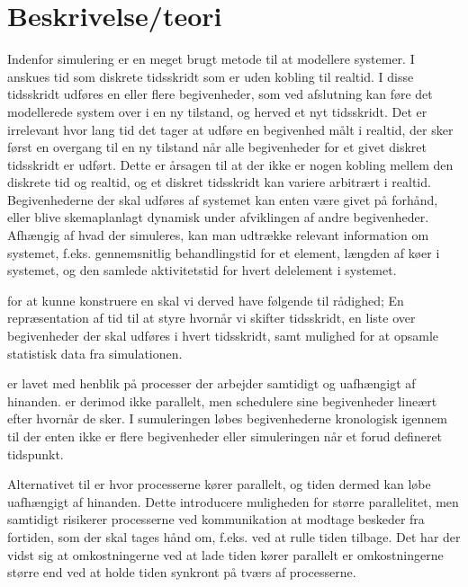 \section{Beskrivelse/teori} \label{sec:des-teori}


Indenfor simulering er \des en meget brugt metode til at modellere systemer. I 
\des anskues tid som diskrete tidsskridt som er uden kobling til realtid. I 
disse tidsskridt udføres en eller flere begivenheder, som ved afslutning kan 
føre det modellerede system over i en ny tilstand, og herved et nyt tidsskridt. 
Det er irrelevant hvor lang tid det tager at udføre en begivenhed målt i 
realtid, der sker først en overgang til en ny tilstand når alle begivenheder 
for et givet diskret tidsskridt er udført. Dette er årsagen til at der ikke er 
nogen kobling mellem den diskrete tid og realtid, og et diskret tidsskridt kan 
variere arbitrært i realtid. Begivenhederne der skal udføres af systemet kan 
enten være givet på forhånd, eller blive skemaplanlagt dynamisk under afviklingen 
af andre begivenheder. 
Afhængig af hvad der simuleres, kan man udtrække relevant information om systemet, f.eks. gennemsnitlig behandlingstid for et element, længden af køer i systemet, og den samlede aktivitetstid for hvert delelement i systemet. 


for at kunne konstruere en \des skal vi derved have følgende til rådighed; En repræsentation af tid til at styre hvornår vi skifter tidsskridt, en liste over begivenheder der skal udføres i hvert tidsskridt, samt mulighed for at opsamle statistisk data fra simulationen. 

    
\csp er lavet med henblik på processer der arbejder samtidigt og uafhængigt af hinanden. \Des er derimod ikke parallelt, men schedulere sine begivenheder lineært efter hvornår de sker. I sumuleringen løbes begivenhederne kronologisk igennem til der enten ikke er flere begivenheder eller simuleringen når et forud defineret tidspunkt.

Alternativet til  \des  er \pdes{} hvor processerne kører parallelt, og  tiden dermed kan løbe uafhængigt af hinanden. Dette introducere muligheden for større parallelitet, men samtidigt risikerer processerne ved kommunikation at modtage beskeder fra fortiden, som der skal tages hånd om, f.eks. ved at rulle tiden tilbage. Det har der vidst sig at omkostningerne ved at lade tiden kører parallelt er omkostningerne større end ved at holde tiden synkront på tværs af processerne.

